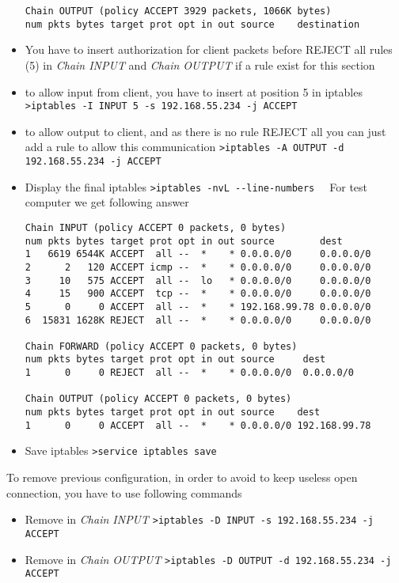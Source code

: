 \begin{itemize}
\begin{lstlisting}[frame=single]
Chain OUTPUT (policy ACCEPT 3929 packets, 1066K bytes)
num pkts bytes target prot opt in out source    destination
\end{lstlisting}
\item You have to insert authorization for client packets before REJECT all rules (5) in \emph{Chain INPUT} and \emph{Chain OUTPUT} if a rule exist for this section
\item to allow input from client, you have to insert at position 5 in iptables
 \newline
 \verb|>iptables -I INPUT 5 -s 192.168.55.234 -j ACCEPT  | 
\item to allow output to client, and as there is no rule REJECT all you can just add a rule to allow this communication
 \newline
 \verb|>iptables -A OUTPUT -d 192.168.55.234 -j ACCEPT  |  
\item Display the final iptables
\newline
\verb|>iptables -nvL --line-numbers  |
\newline
For test computer we get following answer
\begin{lstlisting}[frame=single]
Chain INPUT (policy ACCEPT 0 packets, 0 bytes)
num pkts bytes target prot opt in out source        dest         
1   6619 6544K ACCEPT  all --  *    * 0.0.0.0/0     0.0.0.0/0 
2      2   120 ACCEPT icmp --  *    * 0.0.0.0/0     0.0.0.0/0           
3     10   575 ACCEPT  all --  lo   * 0.0.0.0/0     0.0.0.0/0           
4     15   900 ACCEPT  tcp --  *    * 0.0.0.0/0     0.0.0.0/0
5      0     0 ACCEPT  all --  *    * 192.168.99.78 0.0.0.0/0           
6  15831 1628K REJECT  all --  *    * 0.0.0.0/0     0.0.0.0/0 

Chain FORWARD (policy ACCEPT 0 packets, 0 bytes)
num pkts bytes target prot opt in out source     dest         
1      0     0 REJECT  all --  *    * 0.0.0.0/0  0.0.0.0/0

Chain OUTPUT (policy ACCEPT 0 packets, 0 bytes)
num pkts bytes target prot opt in out source    dest        
1      0     0 ACCEPT  all --  *    * 0.0.0.0/0 192.168.99.78  
\end{lstlisting}
\item Save iptables
\newline
\verb|>service iptables save  |
\end{itemize}
To remove previous configuration, in order to avoid to keep useless open connection, you have to use following commands
\begin{itemize}
\item Remove in \emph{Chain INPUT}
 \newline
 \verb|>iptables -D INPUT -s 192.168.55.234 -j ACCEPT  | 
\item Remove in \emph{Chain OUTPUT}
 \newline
 \verb|>iptables -D OUTPUT -d 192.168.55.234 -j ACCEPT  | 
\end{itemize}

